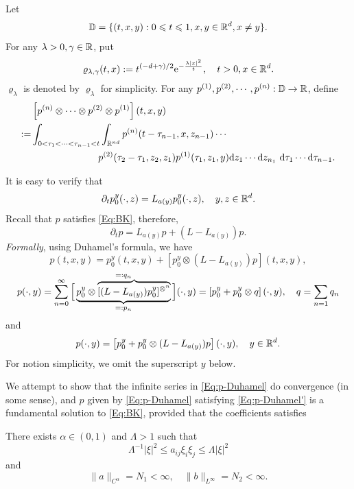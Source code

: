Let 
\[
    {\mathbb D}=\{(t,x,y): 0\leqslant t\leqslant 1, x,y\in {\mathbb R}^d, x\neq y\}. 
\]
For any $\lambda>0, \gamma\in {\mathbb R}$, put  
\[
    \varrho_{\lambda, \gamma}(t, x):= t^{(-d+\gamma)/2} \mathrm{e}^{-\frac{\lambda|x|^2}{ t}} , \quad t> 0, x\in {\mathbb R}^d. 
\]
$\varrho_{\lambda}$ is denoted by $\varrho_\lambda$ for simplicity. For any $p^{(1)}, p^{(2)}, \cdots, p^{(n)}: {\mathbb D}\to {\mathbb R}$, define 
\begin{equation*}
    \begin{aligned}
        &\left[p^{(n)}\otimes \cdots \otimes p^{(2)}\otimes p^{(1)}\right](t,x,y)\\
        :=& \int_{0<\tau_1<\cdots<\tau_{n-1}<t}\int_{{\mathbb R}^{nd}}  p^{(n)}(t-\tau_{n-1}, x, z_{n-1})\cdots\\
        &\qquad \qquad \qquad \quad  p^{(2)}(\tau_2-\tau_1,z_2, z_1)p^{(1)}(\tau_1, z_1, y)\text{\rm{d}} z_1\cdots\text{\rm{d}} z_{n_1}~\text{\rm{d}} \tau_1\cdots\text{\rm{d}} \tau_{n-1}. 
    \end{aligned}
\end{equation*}

\medskip

It is easy to verify that 
$$
\partial_t p_0^y(\cdot,z)=L_{a(y)}p_0^y(\cdot, z), \quad y, z\in {\mathbb R}^d. 
$$
Recall that \(p\) satisfies \eqref{Eq:BK}, therefore, 
\[
\partial_t p= L_{a(y)}p+ (L-L_{a(y)})p. 
\]
{\em Formally}, using Duhamel’s formula, we have 
\[
  p(t,x,y)= p_0^y(t,x,y)+[p_0^y\otimes (L-L_{a(y)})p](t,x,y), 
\]
\begin{align}\label{Eq:p-Duhamel}
p(\cdot,y)=\sum_{n=0}^\infty \Big[ \underbrace{p_0^y \otimes \overbrace{[(L-L_{a(y)})p_0^y]^{\otimes^n}}}^{=:q_n}_{=:p_n}\Big](\cdot,y)=\left[ p_0^y+p_0^y\otimes q\right] (\cdot,y),   \quad q=\sum_{n=1}q_n  
\end{align}
and 
\begin{equation}\label{Eq:p-Duhamel'}
    p(\cdot, y)=\left[p_0^y+p_0^y\otimes (L-L_{a(y)}) p \right] (\cdot, y), \quad y\in {\mathbb R}^d. 
\end{equation}
For notion simplicity, we omit the superscript \(y\) below. 

We attempt to show that the infinite series in \eqref{Eq:p-Duhamel} do convergence (in some sense), and \(p\) given by \eqref{Eq:p-Duhamel} satisfying \eqref{Eq:p-Duhamel'} is a fundamental solution to \eqref{Eq:BK}, provided that the coefficients satisfies 
\begin{assumption}\label{Aspt:ab1}
    There exists \(\alpha\in (0,1)\) and \(\Lambda>1\) such that 
    \begin{equation*}
        \Lambda^{-1} |\xi|^2\leq a_{ij}\xi_i\xi_j\leq \Lambda|\xi|^2
    \end{equation*}
    and
    \begin{equation*}
        \|a\|_{C^\alpha}=N_1<\infty, \quad \|b\|_{L^\infty}=N_2<\infty. 
    \end{equation*}
\end{assumption} 

